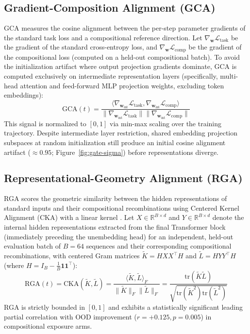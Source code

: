 \documentclass{article}
\theoremstyle{definition}
\begin{document}
\subsection{Gradient-Composition Alignment (GCA)}
GCA measures the cosine alignment between the per-step parameter gradients of the standard task loss and a compositional reference direction. Let $\nabla_{\mathbf{w}} \mathcal{L}_{\text{task}}$ be the gradient of the standard cross-entropy loss, and $\nabla_{\mathbf{w}} \mathcal{L}_{\text{comp}}$ be the gradient of the compositional loss (computed on a held-out compositional batch). To avoid the initialization artifact where output projection gradients dominate, GCA is computed exclusively on intermediate representation layers (specifically, multi-head attention and feed-forward MLP projection weights, excluding token embeddings):
\begin{equation}
\text{GCA}(t) = \frac{\langle \nabla_{\mathbf{w}_{\text{int}}} \mathcal{L}_{\text{task}}, \nabla_{\mathbf{w}_{\text{int}}} \mathcal{L}_{\text{comp}} \rangle}{\| \nabla_{\mathbf{w}_{\text{int}}} \mathcal{L}_{\text{task}} \| \| \nabla_{\mathbf{w}_{\text{int}}} \mathcal{L}_{\text{comp}} \|}
\end{equation}
This signal is normalized to $[0, 1]$ via min-max scaling over the training trajectory. Despite intermediate layer restriction, shared embedding projection subspaces at random initialization still produce an initial cosine alignment artifact ($\approx 0.95$; Figure~\ref{fig:gate-sigma}) before representations diverge.

\subsection{Representational-Geometry Alignment (RGA)}
RGA scores the geometric similarity between the hidden representations of standard inputs and their compositional recombinations using Centered Kernel Alignment (CKA) with a linear kernel \citep{kornblith2019similarity}. Let $X \in \mathbb{R}^{B \times d}$ and $Y \in \mathbb{R}^{B \times d}$ denote the internal hidden representations extracted from the final Transformer block (immediately preceding the unembedding head) for an independent, held-out evaluation batch of $B=64$ sequences and their corresponding compositional recombinations, with centered Gram matrices $\tilde{K} = H X X^\top H$ and $\tilde{L} = H Y Y^\top H$ (where $H = I_B - \frac{1}{B}\mathbf{1}\mathbf{1}^\top$):
\begin{equation}
\text{RGA}(t) = \text{CKA}(\tilde{K}, \tilde{L}) = \frac{\langle \tilde{K}, \tilde{L} \rangle_F}{\| \tilde{K} \|_F \| \tilde{L} \|_F} = \frac{\text{tr}(\tilde{K} \tilde{L})}{\sqrt{\text{tr}(\tilde{K}^2) \text{tr}(\tilde{L}^2)}}
\end{equation}
RGA is strictly bounded in $[0, 1]$ and exhibits a statistically significant leading partial correlation with OOD improvement ($r = +0.125, p = 0.005$) in compositional exposure arms.
\end{document}
